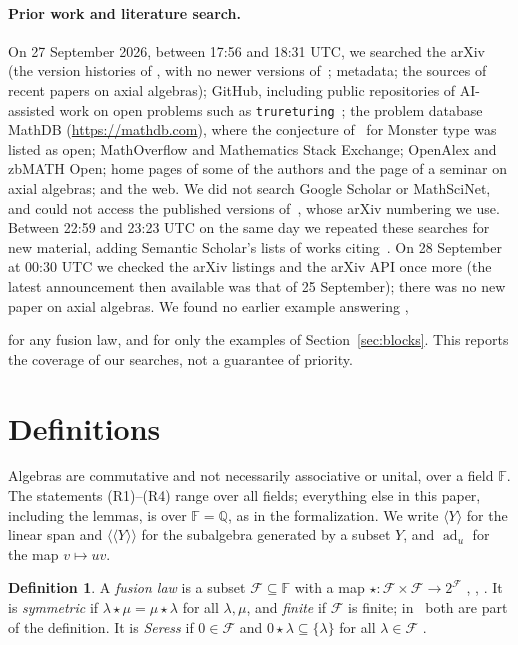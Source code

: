 \documentclass[11pt]{article}
\newif\ifwithC
\theoremstyle{definition}
\newtheorem{definition}[lemma]{Definition}
\theoremstyle{remark}
\newcommand{\Q}{\mathbb Q}
\newcommand{\F}{\mathbb F}
\newcommand{\cF}{\mathcal F}
\newcommand{\lla}{\langle\!\langle}
\newcommand{\rra}{\rangle\!\rangle}
\newcommand{\ad}{\operatorname{ad}}
\begin{document}
\paragraph{Prior work and literature search.}
On 27 September 2026, between 17:56 and 18:31 UTC, we searched the arXiv (the
version histories of \cite{gs,kms,msz,ms,peng}, with no newer versions
of~\cite{gs,msz,ms}; metadata; the sources of recent papers on axial
algebras); GitHub, including public repositories of AI-assisted work on open
problems such as \texttt{trureturing}~\cite{tru}; the problem database MathDB
(\url{https://mathdb.com}), where the conjecture of~\cite{kms} for Monster
type was listed as open; MathOverflow and Mathematics Stack Exchange;
OpenAlex and zbMATH Open; home pages of some of the authors and the page of a
seminar on axial algebras; and the web. We did not search Google Scholar or
MathSciNet, and could not access the published versions
of~\cite{kms,ms}, whose arXiv numbering we use. Between 22:59 and 23:23 UTC
on the same day we repeated these searches for new material, adding
Semantic Scholar's lists of works citing~\cite{gs,msz,ms}. On 28 September
at 00:30 UTC we checked the arXiv listings and the arXiv API once more (the
latest announcement then available was that of 25 September); there was no
new paper on axial algebras.
We found no earlier example
answering \cite[Problem~3.11]{gs}, \cite[Question~9.5]{msz}
\ifwithC
or \cite[Problem~3.8]{gs}, \cite[Question~9.2]{msz}
\fi
for any fusion law, and for \cite[Problem~3.9]{gs} only the examples of
Section~\ref{sec:blocks}.
This reports the coverage of our searches, not a guarantee of priority.

\section{Definitions}\label{sec:def}

Algebras are commutative and not necessarily associative or unital, over a
field $\F$. The statements (R1)--\ifwithC(R5)\else(R4)\fi{} range over all
fields; everything else
in this paper, including the lemmas, is over $\F=\Q$, as in the
formalization. We write $\langle Y\rangle$ for the
linear span and $\lla Y\rra$ for the subalgebra generated by a subset $Y$,
and $\ad_u$ for the map $v\mapsto uv$.

\begin{definition}\label{def:law}
A \emph{fusion law} is a subset $\cF\subseteq\F$ with a map
$\star\colon\cF\times\cF\to2^{\cF}$ \cite[Def.~2.1]{gs},
\cite[Def.~2.1]{msz}, \cite[Def.~2.1]{ms}. It is \emph{symmetric} if
$\lambda\star\mu=\mu\star\lambda$ for all $\lambda,\mu$, and
\emph{finite} if $\cF$ is finite; in~\cite[Def.~2.1]{kms} both are part of
the definition. It is \emph{Seress} if $0\in\cF$ and
$0\star\lambda\subseteq\{\lambda\}$ for all $\lambda\in\cF$
\cite[Def.~3.9]{ms}.
\end{definition}
\end{document}
